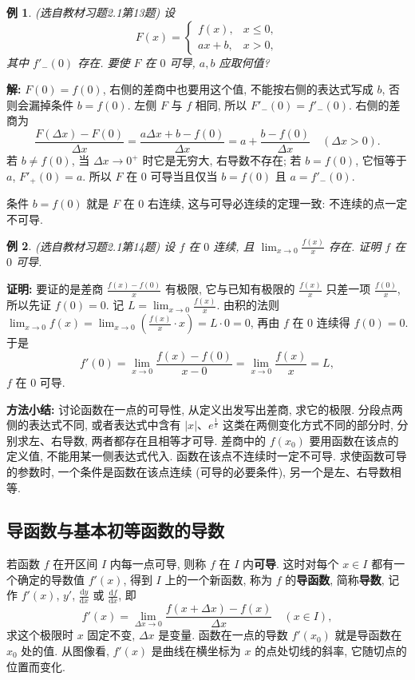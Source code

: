 \documentclass[UTF8,openany]{ctexbook}
\theoremstyle{chinesetextbook}
\newtheorem{example}{例}[section]
\newenvironment{cnproof}{\par\indent\textbf{证明:} \ignorespaces}{\par}
\newenvironment{cnsolution}{\par\indent\textbf{解:} \ignorespaces}{\par}
\newcommand{\dd}{\mathrm d}
\begin{document}
\begin{example}\label{ex:c2-h1-13}
\textnormal{(选自教材习题2.1第13题)} 设
\[
F(x)=\begin{cases}f(x),&x\le0,\\ax+b,&x>0,\end{cases}
\]
其中 $f'_-(0)$ 存在. 要使 $F$ 在 $0$ 可导, $a,b$ 应取何值?
\end{example}
\begin{cnsolution}
$F(0)=f(0)$, 右侧的差商中也要用这个值, 不能按右侧的表达式写成 $b$, 否则会漏掉条件 $b=f(0)$. 左侧 $F$ 与 $f$ 相同, 所以 $F'_-(0)=f'_-(0)$. 右侧的差商为
\[
\frac{F(\Delta x)-F(0)}{\Delta x}=\frac{a\Delta x+b-f(0)}{\Delta x}=a+\frac{b-f(0)}{\Delta x}\quad(\Delta x>0).
\]
若 $b\ne f(0)$, 当 $\Delta x\to0^+$ 时它是无穷大, 右导数不存在; 若 $b=f(0)$, 它恒等于 $a$, $F'_+(0)=a$. 所以 $F$ 在 $0$ 可导当且仅当 $b=f(0)$ 且 $a=f'_-(0)$.
\end{cnsolution}
条件 $b=f(0)$ 就是 $F$ 在 $0$ 右连续, 这与可导必连续的定理一致: 不连续的点一定不可导.
\begin{example}\label{ex:c2-h1-14}
\textnormal{(选自教材习题2.1第14题)} 设 $f$ 在 $0$ 连续, 且 $\displaystyle\lim_{x\to0}\frac{f(x)}x$ 存在. 证明 $f$ 在 $0$ 可导.
\end{example}
\begin{cnproof}
要证的是差商 $\displaystyle\frac{f(x)-f(0)}x$ 有极限, 它与已知有极限的 $\displaystyle\frac{f(x)}x$ 只差一项 $\displaystyle\frac{f(0)}x$, 所以先证 $f(0)=0$. 记 $\displaystyle L=\lim_{x\to0}\frac{f(x)}x$. 由积的法则 $\displaystyle\lim_{x\to0}f(x)=\lim_{x\to0}\left(\frac{f(x)}x\cdot x\right)=L\cdot0=0$, 再由 $f$ 在 $0$ 连续得 $f(0)=0$. 于是
\[
f'(0)=\lim_{x\to0}\frac{f(x)-f(0)}{x-0}=\lim_{x\to0}\frac{f(x)}x=L,
\]
$f$ 在 $0$ 可导.
\end{cnproof}
\par\indent\textbf{方法小结:} 讨论函数在一点的可导性, 从定义出发写出差商, 求它的极限. 分段点两侧的表达式不同, 或者表达式中含有 $|x|$、$e^{\frac1x}$ 这类在两侧变化方式不同的部分时, 分别求左、右导数, 两者都存在且相等才可导. 差商中的 $f(x_0)$ 要用函数在该点的定义值, 不能用某一侧表达式代入. 函数在该点不连续时一定不可导. 求使函数可导的参数时, 一个条件是函数在该点连续 (可导的必要条件), 另一个是左、右导数相等.
\subsection{导函数与基本初等函数的导数}
若函数 $f$ 在开区间 $I$ 内每一点可导, 则称 $f$ 在 $I$ 内\textbf{可导}. 这时对每个 $x\in I$ 都有一个确定的导数值 $f'(x)$, 得到 $I$ 上的一个新函数, 称为 $f$ 的\textbf{导函数}, 简称\textbf{导数}, 记作 $f'(x)$, $y'$, $\displaystyle\frac{\dd y}{\dd x}$ 或 $\displaystyle\frac{\dd f}{\dd x}$, 即
\[
f'(x)=\lim_{\Delta x\to0}\frac{f(x+\Delta x)-f(x)}{\Delta x}\quad(x\in I),
\]
求这个极限时 $x$ 固定不变, $\Delta x$ 是变量. 函数在一点的导数 $f'(x_0)$ 就是导函数在 $x_0$ 处的值. 从图像看, $f'(x)$ 是曲线在横坐标为 $x$ 的点处切线的斜率, 它随切点的位置而变化.
\end{document}
